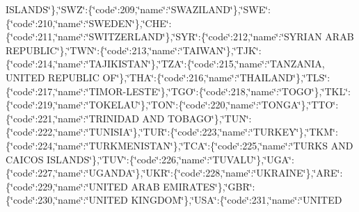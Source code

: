 \begin{DoxyCompactItemize}
I\-S\-L\-A\-N\-D\-S\char`\"{}\},\char`\"{}S\-W\-Z\char`\"{}\-:\{\char`\"{}code\char`\"{}\-:209,\char`\"{}name\char`\"{}\-:\char`\"{}S\-W\-A\-Z\-I\-L\-A\-N\-D\char`\"{}\},\char`\"{}S\-W\-E\char`\"{}\-:\{\char`\"{}code\char`\"{}\-:210,\char`\"{}name\char`\"{}\-:\char`\"{}S\-W\-E\-D\-E\-N\char`\"{}\},\char`\"{}C\-H\-E\char`\"{}\-:\{\char`\"{}code\char`\"{}\-:211,\char`\"{}name\char`\"{}\-:\char`\"{}S\-W\-I\-T\-Z\-E\-R\-L\-A\-N\-D\char`\"{}\},\char`\"{}S\-Y\-R\char`\"{}\-:\{\char`\"{}code\char`\"{}\-:212,\char`\"{}name\char`\"{}\-:\char`\"{}S\-Y\-R\-I\-A\-N A\-R\-A\-B R\-E\-P\-U\-B\-L\-I\-C\char`\"{}\},\char`\"{}T\-W\-N\char`\"{}\-:\{\char`\"{}code\char`\"{}\-:213,\char`\"{}name\char`\"{}\-:\char`\"{}T\-A\-I\-W\-A\-N\char`\"{}\},\char`\"{}T\-J\-K\char`\"{}\-:\{\char`\"{}code\char`\"{}\-:214,\char`\"{}name\char`\"{}\-:\char`\"{}T\-A\-J\-I\-K\-I\-S\-T\-A\-N\char`\"{}\},\char`\"{}T\-Z\-A\char`\"{}\-:\{\char`\"{}code\char`\"{}\-:215,\char`\"{}name\char`\"{}\-:\char`\"{}T\-A\-N\-Z\-A\-N\-I\-A, U\-N\-I\-T\-E\-D R\-E\-P\-U\-B\-L\-I\-C O\-F\char`\"{}\},\char`\"{}T\-H\-A\char`\"{}\-:\{\char`\"{}code\char`\"{}\-:216,\char`\"{}name\char`\"{}\-:\char`\"{}T\-H\-A\-I\-L\-A\-N\-D\char`\"{}\},\char`\"{}T\-L\-S\char`\"{}\-:\{\char`\"{}code\char`\"{}\-:217,\char`\"{}name\char`\"{}\-:\char`\"{}T\-I\-M\-O\-R-\/L\-E\-S\-T\-E\char`\"{}\},\char`\"{}T\-G\-O\char`\"{}\-:\{\char`\"{}code\char`\"{}\-:218,\char`\"{}name\char`\"{}\-:\char`\"{}T\-O\-G\-O\char`\"{}\},\char`\"{}T\-K\-L\char`\"{}\-:\{\char`\"{}code\char`\"{}\-:219,\char`\"{}name\char`\"{}\-:\char`\"{}T\-O\-K\-E\-L\-A\-U\char`\"{}\},\char`\"{}T\-O\-N\char`\"{}\-:\{\char`\"{}code\char`\"{}\-:220,\char`\"{}name\char`\"{}\-:\char`\"{}T\-O\-N\-G\-A\char`\"{}\},\char`\"{}T\-T\-O\char`\"{}\-:\{\char`\"{}code\char`\"{}\-:221,\char`\"{}name\char`\"{}\-:\char`\"{}T\-R\-I\-N\-I\-D\-A\-D A\-N\-D T\-O\-B\-A\-G\-O\char`\"{}\},\char`\"{}T\-U\-N\char`\"{}\-:\{\char`\"{}code\char`\"{}\-:222,\char`\"{}name\char`\"{}\-:\char`\"{}T\-U\-N\-I\-S\-I\-A\char`\"{}\},\char`\"{}T\-U\-R\char`\"{}\-:\{\char`\"{}code\char`\"{}\-:223,\char`\"{}name\char`\"{}\-:\char`\"{}T\-U\-R\-K\-E\-Y\char`\"{}\},\char`\"{}T\-K\-M\char`\"{}\-:\{\char`\"{}code\char`\"{}\-:224,\char`\"{}name\char`\"{}\-:\char`\"{}T\-U\-R\-K\-M\-E\-N\-I\-S\-T\-A\-N\char`\"{}\},\char`\"{}T\-C\-A\char`\"{}\-:\{\char`\"{}code\char`\"{}\-:225,\char`\"{}name\char`\"{}\-:\char`\"{}T\-U\-R\-K\-S A\-N\-D C\-A\-I\-C\-O\-S I\-S\-L\-A\-N\-D\-S\char`\"{}\},\char`\"{}T\-U\-V\char`\"{}\-:\{\char`\"{}code\char`\"{}\-:226,\char`\"{}name\char`\"{}\-:\char`\"{}T\-U\-V\-A\-L\-U\char`\"{}\},\char`\"{}U\-G\-A\char`\"{}\-:\{\char`\"{}code\char`\"{}\-:227,\char`\"{}name\char`\"{}\-:\char`\"{}U\-G\-A\-N\-D\-A\char`\"{}\},\char`\"{}U\-K\-R\char`\"{}\-:\{\char`\"{}code\char`\"{}\-:228,\char`\"{}name\char`\"{}\-:\char`\"{}U\-K\-R\-A\-I\-N\-E\char`\"{}\},\char`\"{}A\-R\-E\char`\"{}\-:\{\char`\"{}code\char`\"{}\-:229,\char`\"{}name\char`\"{}\-:\char`\"{}U\-N\-I\-T\-E\-D A\-R\-A\-B E\-M\-I\-R\-A\-T\-E\-S\char`\"{}\},\char`\"{}G\-B\-R\char`\"{}\-:\{\char`\"{}code\char`\"{}\-:230,\char`\"{}name\char`\"{}\-:\char`\"{}U\-N\-I\-T\-E\-D K\-I\-N\-G\-D\-O\-M\char`\"{}\},\char`\"{}U\-S\-A\char`\"{}\-:\{\char`\"{}code\char`\"{}\-:231,\char`\"{}name\char`\"{}\-:\char`\"{}U\-N\-I\-T\-E\-D 
\end{DoxyCompactItemize}
